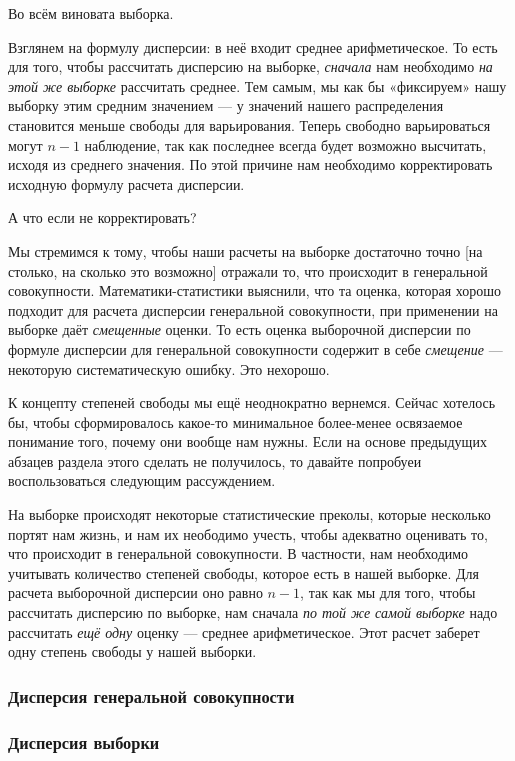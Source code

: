 \documentclass[
  letterpaper,
]{scrbook}
\theoremstyle{definition}
\theoremstyle{remark}
\begin{document}
Во всём виновата выборка.

Взглянем на формулу дисперсии: в неё входит среднее арифметическое. То
есть для того, чтобы рассчитать дисперсию на выборке, \emph{сначала} нам
необходимо \emph{на этой же выборке} рассчитать среднее. Тем самым, мы
как бы «фиксируем» нашу выборку этим средним значением --- у значений
нашего распределения становится меньше свободы для варьирования. Теперь
свободно варьироваться могут \(n-1\) наблюдение, так как последнее
всегда будет возможно высчитать, исходя из среднего значения. По этой
причине нам необходимо корректировать исходную формулу расчета
дисперсии.

А что если не корректировать?

Мы стремимся к тому, чтобы наши расчеты на выборке достаточно точно
{[}на столько, на сколько это возможно{]} отражали то, что происходит в
генеральной совокупности. Математики-статистики выяснили, что та оценка,
которая хорошо подходит для расчета дисперсии генеральной совокупности,
при применении на выборке даёт \emph{смещенные} оценки. То есть оценка
выборочной дисперсии по формуле дисперсии для генеральной совокупности
содержит в себе \emph{смещение} --- некоторую систематическую ошибку.
Это нехорошо.

К концепту степеней свободы мы ещё неоднократно вернемся. Сейчас
хотелось бы, чтобы сформировалось какое-то минимальное более-менее
освязаемое понимание того, почему они вообще нам нужны. Если на основе
предыдущих абзацев раздела этого сделать не получилось, то давайте
попробуеи воспользоваться следующим рассуждением.

На выборке происходят некоторые статистические преколы, которые
несколько портят нам жизнь, и нам их неободимо учесть, чтобы адекватно
оценивать то, что происходит в генеральной совокупности. В частности,
нам необходимо учитывать количество степеней свободы, которое есть в
нашей выборке. Для расчета выборочной дисперсии оно равно \(n-1\), так
как мы для того, чтобы рассчитать дисперсию по выборке, нам сначала
\emph{по той же самой выборке} надо рассчитать \emph{ещё одну} оценку
--- среднее арифметическое. Этот расчет заберет одну степень свободы у
нашей выборки.

\subsubsection{Дисперсия генеральной
совокупности}\label{andan-descriptives-population-variance}

\subsubsection{Дисперсия
выборки}\label{andan-descriptives-sample-variance}
\end{document}
